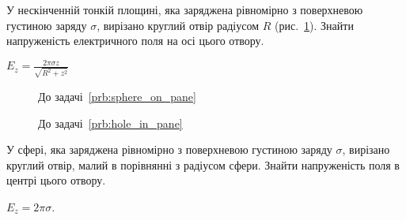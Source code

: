 \begin{problem}\label{prb:hole_in_pane}
У нескінченній тонкій площині, яка заряджена рівномірно з поверхневою густиною заряду $\sigma$, вирізано круглий отвір радіусом $R$ (рис.~\ref{hole_in_pane}). Знайти напруженість електричного поля на осі цього отвору.
\begin{solution}
	$E_z = \frac{2\pi\sigma z}{\sqrt{R^2 + z^2}}$
\end{solution}
\end{problem}

\begin{figure}[h!]\centering
	\begin{minipage}[t]{0.45\linewidth}\centering
		\caption{До задачі~\ref{prb:sphere_on_pane}}
		\label{sphere_on_pane}
	\end{minipage}
	\begin{minipage}[t]{0.45\linewidth}\centering
		\caption{До задачі~\ref{prb:hole_in_pane}}
		\label{hole_in_pane}
	\end{minipage}
\end{figure}

\begin{problem}
У сфері, яка заряджена рівномірно з поверхневою густиною заряду $\sigma$, вирізано круглий отвір, малий в порівнянні з радіусом сфери. Знайти напруженість поля в центрі цього отвору.
\begin{solution}
	$E_z = 2\pi\sigma$.
\end{solution}
\end{problem}

